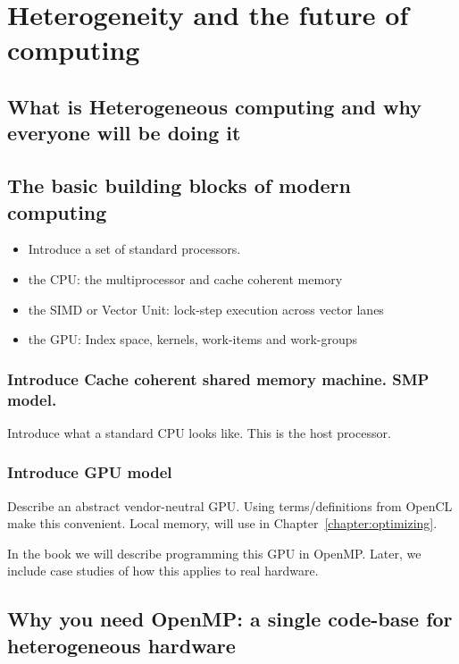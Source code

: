 
\chapter{Heterogeneity and the future of computing}
\label{chapter:heterogeneity}

\section{What is Heterogeneous computing and why everyone will be doing it}

\section{The basic building blocks of modern computing}

\begin{itemize}
\item Introduce a set of standard processors.
\item  the CPU: the multiprocessor and cache coherent memory
\item  the SIMD or Vector Unit: lock-step execution across vector lanes
\item  the GPU:  Index space, kernels, work-items and work-groups
\end{itemize}

\subsection{Introduce Cache coherent shared memory machine. SMP model.}
Introduce what a standard CPU looks like. This is the host processor.

\subsection{Introduce GPU model}
Describe an abstract vendor-neutral GPU.
Using terms/definitions from OpenCL make this convenient.
Local memory, will use in Chapter~\ref{chapter:optimizing}.

In the book we will describe programming this GPU in OpenMP.
Later, we include case studies of how this applies to real hardware.


\section{Why you need OpenMP: a single code-base for heterogeneous hardware}




